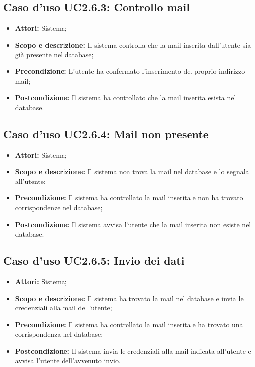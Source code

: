 \subsection{Caso d'uso UC2.6.3: Controllo mail}
\begin{itemize}
	\item \textbf{Attori:} Sistema;
	\item \textbf{Scopo e descrizione:} Il sistema controlla che la mail inserita dall'utente sia già presente nel database;
	\item \textbf{Precondizione:} L'utente ha confermato l'inserimento del proprio indirizzo mail;
	\item \textbf{Postcondizione:} Il sistema ha controllato che la mail inserita esista nel database.
\end{itemize}

\subsection{Caso d'uso UC2.6.4: Mail non presente}
\begin{itemize}
	\item \textbf{Attori:} Sistema;
	\item \textbf{Scopo e descrizione:} Il sistema non trova la mail nel database e lo segnala all'utente;
	\item \textbf{Precondizione:} Il sistema ha controllato la mail inserita e non ha trovato corrispondenze nel database;
	\item \textbf{Postcondizione:} Il sistema avvisa l'utente che la mail inserita non esiste nel database.
\end{itemize}

\subsection{Caso d'uso UC2.6.5: Invio dei dati}
\begin{itemize}
	\item \textbf{Attori:} Sistema;
	\item \textbf{Scopo e descrizione:} Il sistema ha trovato la mail nel database e invia le credenziali alla mail dell'utente;
	\item \textbf{Precondizione:} Il sistema ha controllato la mail inserita e ha trovato una corrispondenza nel database;
	\item \textbf{Postcondizione:} Il sistema invia le credenziali alla mail indicata all'utente e avvisa l'utente dell'avvenuto invio.
\end{itemize}
